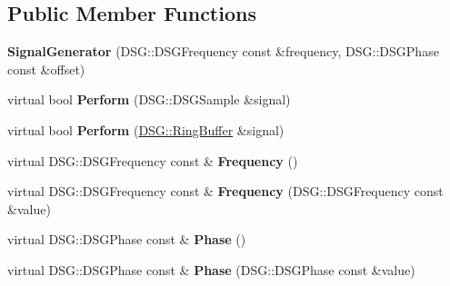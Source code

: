 \subsection*{Public Member Functions}
\begin{DoxyCompactItemize}
\item 
\hypertarget{class_d_s_g_1_1_signal_generator_a4036fceff5c05a3711b8516d850c414c}{{\bfseries Signal\+Generator} (D\+S\+G\+::\+D\+S\+G\+Frequency const \&frequency, D\+S\+G\+::\+D\+S\+G\+Phase const \&offset)}\label{class_d_s_g_1_1_signal_generator_a4036fceff5c05a3711b8516d850c414c}

\item 
\hypertarget{class_d_s_g_1_1_signal_generator_a46fe75a81a242e191c5049d33ddf4155}{virtual bool {\bfseries Perform} (D\+S\+G\+::\+D\+S\+G\+Sample \&signal)}\label{class_d_s_g_1_1_signal_generator_a46fe75a81a242e191c5049d33ddf4155}

\item 
\hypertarget{class_d_s_g_1_1_signal_generator_ab050f80e84e6c8b3e354b56930d6a02b}{virtual bool {\bfseries Perform} (\hyperlink{class_d_s_g_1_1_ring_buffer}{D\+S\+G\+::\+Ring\+Buffer} \&signal)}\label{class_d_s_g_1_1_signal_generator_ab050f80e84e6c8b3e354b56930d6a02b}

\item 
\hypertarget{class_d_s_g_1_1_signal_generator_a4e6b3c43e76e53f8cd337ad699c464cb}{virtual D\+S\+G\+::\+D\+S\+G\+Frequency const \& {\bfseries Frequency} ()}\label{class_d_s_g_1_1_signal_generator_a4e6b3c43e76e53f8cd337ad699c464cb}

\item 
\hypertarget{class_d_s_g_1_1_signal_generator_a30a79888f209d692df3d38f53fc58dfe}{virtual D\+S\+G\+::\+D\+S\+G\+Frequency const \& {\bfseries Frequency} (D\+S\+G\+::\+D\+S\+G\+Frequency const \&value)}\label{class_d_s_g_1_1_signal_generator_a30a79888f209d692df3d38f53fc58dfe}

\item 
\hypertarget{class_d_s_g_1_1_signal_generator_a17cc4287b2838c6b6194fd43d02e7c00}{virtual D\+S\+G\+::\+D\+S\+G\+Phase const \& {\bfseries Phase} ()}\label{class_d_s_g_1_1_signal_generator_a17cc4287b2838c6b6194fd43d02e7c00}

\item 
\hypertarget{class_d_s_g_1_1_signal_generator_a315a3d3fca83eab7030af77dba63a564}{virtual D\+S\+G\+::\+D\+S\+G\+Phase const \& {\bfseries Phase} (D\+S\+G\+::\+D\+S\+G\+Phase const \&value)}\label{class_d_s_g_1_1_signal_generator_a315a3d3fca83eab7030af77dba63a564}

\end{DoxyCompactItemize}
